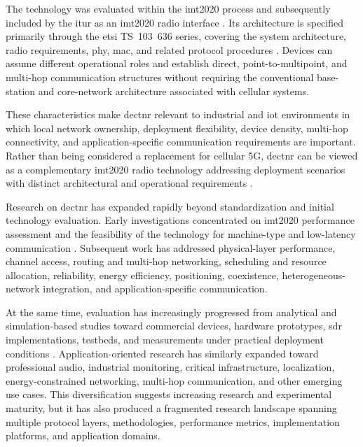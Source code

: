 The technology was evaluated within the \gls{imt2020} process and subsequently
included by the \gls{itur} as an \gls{imt2020} radio interface
\cite{itur_m2150,
maliatsosEvaluationIMT2020Candidate2022a,
smidaETSIDECT2020Component2023}. Its architecture is specified primarily
through the \gls{etsi} TS~103~636 series, covering the system architecture,
radio requirements, \gls{phy}, \gls{mac}, and related protocol procedures
\cite{etsi_ts103636_1,
etsi_ts103636_2,
etsi_ts103636_3,
etsi_ts103636_4,
etsi_ts103636_5}. Devices can assume different operational roles and establish
direct, point-to-multipoint, and multi-hop communication structures without
requiring the conventional base-station and core-network architecture
associated with cellular systems.

These characteristics make \gls{dectnr} relevant to industrial and
\gls{iot} environments in which local network ownership, deployment
flexibility, device density, multi-hop connectivity, and application-specific
communication requirements are important. Rather than being considered a
replacement for cellular 5G, \gls{dectnr} can be viewed as a complementary
\gls{imt2020} radio technology addressing deployment scenarios with distinct
architectural and operational requirements
\cite{kovalchukovDECT2020NewRadio2022,
perez-guiraoDECTNRUnveiling2022,
smidaETSIDECT2020Component2023}.

Research on \gls{dectnr} has expanded rapidly beyond standardization and
initial technology evaluation. Early investigations concentrated on
\gls{imt2020} performance assessment and the feasibility of the technology
for machine-type and low-latency communication
\cite{maliatsosEvaluationIMT2020Candidate2022a,
smidaETSIDECT2020Component2023}. Subsequent work has addressed physical-layer
performance, channel access, routing and multi-hop networking, scheduling and
resource allocation, reliability, energy efficiency, positioning,
coexistence, heterogeneous-network integration, and application-specific
communication.

At the same time, evaluation has increasingly progressed from analytical and
simulation-based studies toward commercial devices, hardware prototypes,
\gls{sdr} implementations, testbeds, and measurements under practical
deployment conditions
\cite{fagerholmFPGAbasedDECT2020New2024,
wassmannPerformanceDECT2020NR2024,
bandaraExperimentalValidationAnalysis2025,
haqueDECT2020NRLink2025,
grafWhatExpectWhen2026}. Application-oriented research has similarly expanded
toward professional audio, industrial monitoring, critical infrastructure,
localization, energy-constrained networking, multi-hop communication, and
other emerging use cases. This diversification suggests increasing research
and experimental maturity, but it has also produced a fragmented research
landscape spanning multiple protocol layers, methodologies, performance
metrics, implementation platforms, and application domains.

